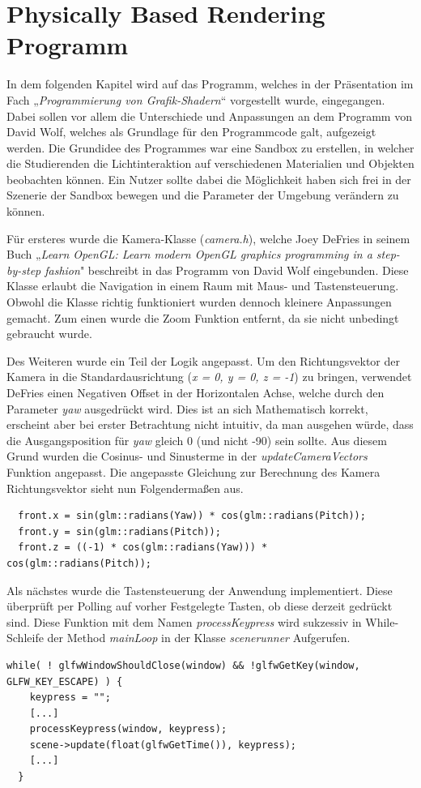 \documentclass[
  11pt,
  a4paper,
  oneside
  ]{article}
\begin{document}
\section{Physically Based Rendering Programm}
In dem folgenden Kapitel wird auf das Programm, welches in der Präsentation im Fach „\textit{Programmierung von Grafik-Shadern}“ vorgestellt wurde, eingegangen. Dabei sollen vor allem die Unterschiede und Anpassungen an dem Programm von David Wolf, welches als Grundlage für den Programmcode galt, aufgezeigt werden. Die Grundidee des Programmes war eine Sandbox zu erstellen, in welcher die Studierenden die Lichtinteraktion auf verschiedenen Materialien und Objekten beobachten können. Ein Nutzer sollte dabei die Möglichkeit haben sich frei in der Szenerie der Sandbox bewegen und die Parameter der Umgebung verändern zu können.

Für ersteres wurde die Kamera-Klasse (\textit{camera.h}), welche Joey DeFries in seinem Buch „\textit{Learn OpenGL: Learn modern OpenGL graphics programming in a step-by-step fashion}"\cite{learnOpenGL} beschreibt in das Programm von David Wolf eingebunden. Diese Klasse erlaubt die Navigation in einem Raum mit Maus- und Tastensteuerung. Obwohl die Klasse richtig funktioniert wurden dennoch kleinere Anpassungen gemacht. Zum einen wurde die Zoom Funktion entfernt, da sie nicht unbedingt gebraucht wurde. 

Des Weiteren wurde ein Teil der Logik angepasst. Um den Richtungsvektor der Kamera in die Standardausrichtung (\textit{x = 0, y = 0, z = -1}) zu bringen, verwendet DeFries einen Negativen Offset in der Horizontalen Achse, welche durch den Parameter \textit{yaw} ausgedrückt wird. Dies ist an sich Mathematisch korrekt, erscheint aber bei erster Betrachtung nicht intuitiv, da man ausgehen würde, dass die Ausgangsposition für \textit{yaw} gleich 0 (und nicht -90) sein sollte. Aus diesem Grund wurden die Cosinus- und Sinusterme in der \textit{updateCameraVectors} Funktion angepasst. Die angepasste Gleichung zur Berechnung des Kamera Richtungsvektor sieht nun Folgendermaßen aus.
\begin{lstlisting}
  front.x = sin(glm::radians(Yaw)) * cos(glm::radians(Pitch));
  front.y = sin(glm::radians(Pitch));
  front.z = ((-1) * cos(glm::radians(Yaw))) * cos(glm::radians(Pitch));
\end{lstlisting}\hfill

Als nächstes wurde die Tastensteuerung der Anwendung implementiert. Diese über\-prüft per Polling auf vorher Festgelegte Tasten, ob diese derzeit gedrückt sind. Diese Funktion mit dem Namen \textit{processKeypress} wird sukzessiv in While-Schleife der Method \textit{mainLoop} in der Klasse \textit{scenerunner} Aufgerufen.  
\begin{lstlisting}[tabsize=2]
  while( ! glfwWindowShouldClose(window) && !glfwGetKey(window, GLFW_KEY_ESCAPE) ) {
    keypress = "";
    [...]
    processKeypress(window, keypress);
    scene->update(float(glfwGetTime()), keypress);
    [...]
  }
\end{lstlisting}
\end{document}
